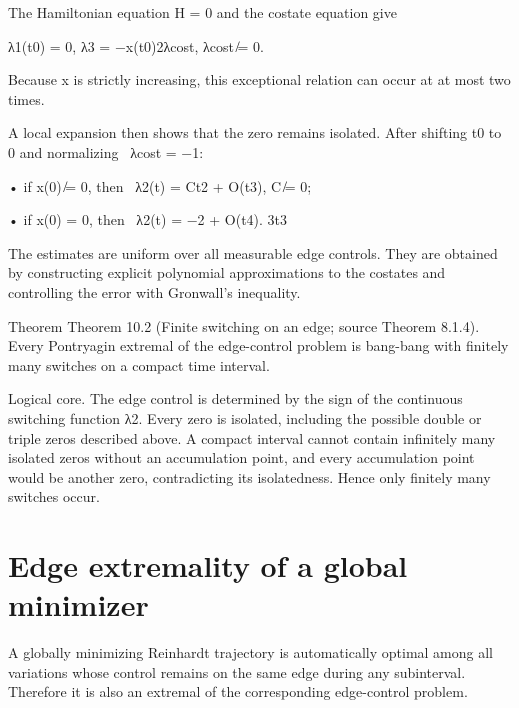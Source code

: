 The Hamiltonian equation H = 0 and the costate equation give


\begin{displaytext}
λ1(t0) = 0, λ3 = −x(t0)2λcost, λcost ̸= 0.
\end{displaytext}

Because x is strictly increasing, this exceptional relation can occur at at most two times.


\begin{displaytext}
A local expansion then shows that the zero remains isolated. After shifting t0 to 0 and normalizing \
λcost = −1:
\end{displaytext}

\begin{displaytext}
• if x(0) ̸= 0, then \
λ2(t) = Ct2 + O(t3), C ̸= 0;
\end{displaytext}

\begin{displaytext}
• if x(0) = 0, then \
λ2(t) = −2 + O(t4). 3t3
\end{displaytext}

The estimates are uniform over all measurable edge controls. They are obtained by constructing explicit polynomial approximations to the costates and controlling the error with Gronwall’s inequality.


\begin{statementbox}{Theorem}
Theorem 10.2 (Finite switching on an edge; source Theorem 8.1.4). Every Pontryagin extremal of the edge-control problem is bang-bang with finitely many switches on a compact time interval.
\end{statementbox}

Logical core. The edge control is determined by the sign of the continuous switching function λ2. Every zero is isolated, including the possible double or triple zeros described above. A compact interval cannot contain infinitely many isolated zeros without an accumulation point, and every accumulation point would be another zero, contradicting its isolatedness. Hence only finitely many switches occur.


\section{Edge extremality of a global minimizer}

A globally minimizing Reinhardt trajectory is automatically optimal among all variations whose control remains on the same edge during any subinterval. Therefore it is also an extremal of the corresponding edge-control problem.


